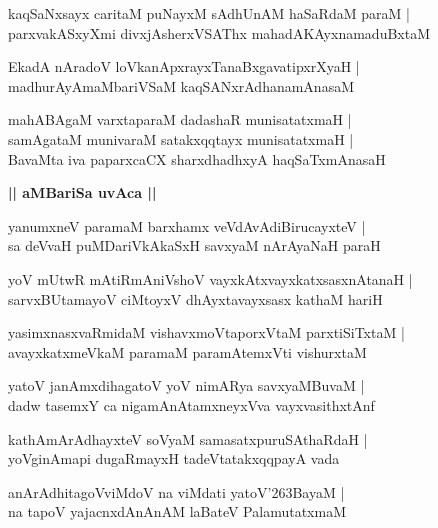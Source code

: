 \documentclass[twoside,12pt,openright]{book}
\def\S{\char'263}
\newcounter{shloka}[chapter]
\def\uvaca#1{\centerline{{\large\textbf{#1}}}}
\begin{document}
\begin{shloka}%
kaqSaNxsayx caritaM puNayxM sAdhUnAM haSaRdaM paraM |\\
parxvakASxyXmi divxjAsherxVSAThx mahadAKAyxnamaduBxtaM
\end{shloka}

\begin{shloka}%
EkadA nAradoV loVkanApxrayxTanaBxgavatipxrXyaH |\\
madhurAyAmaMbariVSaM kaqSANxrAdhanamAnasaM 
\end{shloka}

\begin{shloka}%
mahABAgaM varxtaparaM dadashaR munisatatxmaH |\\
samAgataM munivaraM satakxqqtayx munisatatxmaH |\\
BavaMta iva paparxcaCX sharxdhadhxyA haqSaTxmAnasaH 
\end{shloka}

\uvaca{|| aMBariSa uvAca ||}

\begin{shloka}%
yanumxneV paramaM barxhamx veVdAvAdiBirucayxteV |\\
sa deVvaH puMDariVkAkaSxH savxyaM nArAyaNaH paraH 
\end{shloka}

\begin{shloka}%
yoV mUtwR mAtiRmAniVshoV vayxkAtxvayxkatxsasxnAtanaH |\\
sarvxBUtamayoV ciMtoyxV dhAyxtavayxsasx kathaM hariH 
\end{shloka}

\begin{shloka}%
yasimxnasxvaRmidaM vishavxmoVtaporxVtaM parxtiSiTxtaM |\\
avayxkatxmeVkaM paramaM paramAtemxVti vishurxtaM 
\end{shloka}

\begin{shloka}%
yatoV janAmxdihagatoV yoV nimARya savxyaMBuvaM |\\
dadw tasemxY ca nigamAnAtamxneyxVva vayxvasithxtAnf 
\end{shloka}

\begin{shloka}%
kathAmArAdhayxteV soVyaM samasatxpuruSAthaRdaH |\\
yoVginAmapi dugaRmayxH tadeVtatakxqqpayA vada
\end{shloka}

\begin{shloka}%
anArAdhitagoVviMdoV na viMdati yatoV\S BayaM |\\
na tapoV yajacnxdAnAnAM laBateV PalamutatxmaM 
\end{shloka}
\end{document}
